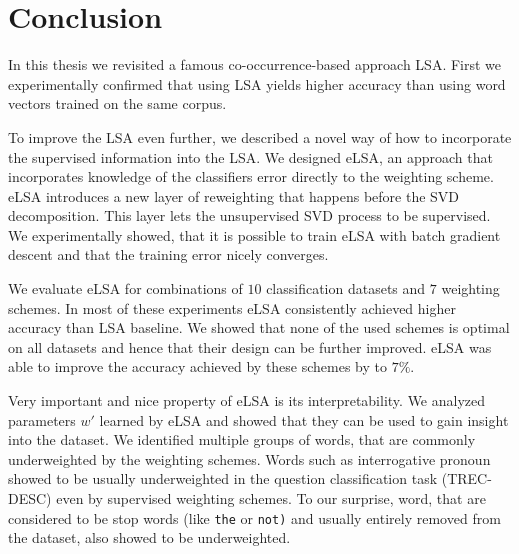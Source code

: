 \chapter*{Conclusion}
\* %

In this thesis we revisited a famous co-occurrence-based approach LSA.
First we experimentally confirmed that using LSA yields higher accuracy than using
word vectors trained on the same corpus.

To improve the LSA even further, we described a novel way of how to incorporate the supervised information into the LSA.
We designed eLSA, an approach that incorporates knowledge of the classifiers error directly to the weighting scheme.
eLSA introduces a new layer of reweighting that happens before the SVD decomposition.
This layer lets the unsupervised SVD process to be supervised.
We experimentally showed, that it is possible to train eLSA with batch gradient descent and that the training error nicely converges.

We evaluate eLSA for combinations of $10$  classification datasets and $7$ weighting schemes.
In most of these experiments eLSA consistently achieved higher accuracy than LSA baseline.
We showed that none of the used schemes is optimal on all datasets and hence that their design can be further improved.
eLSA was able to improve the accuracy achieved by these schemes by to $7\%$.

Very important and nice property of eLSA is its interpretability.
We analyzed parameters $w'$ learned by eLSA and showed that they can be used to gain insight into the dataset.
We identified multiple groups of words, that are commonly underweighted by the weighting schemes.
Words such as interrogative pronoun showed to be usually underweighted in the question classification task (TREC-DESC) even by supervised weighting schemes. 
To our surprise, word, that are considered to be stop words (like \texttt{the} or \texttt{not)} and usually entirely removed from the dataset, also showed to be underweighted. 


